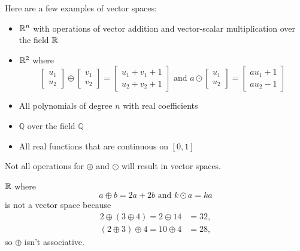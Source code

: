\vspace{1pt}

\begin{example}
	Here are a few examples of vector spaces:
	\begin{itemize}
		\item
		$\mathbb{R}^n$ with operations of vector addition and vector-scalar multiplication over the field $\mathbb{R}$
		\item
		$\mathbb{R}^2$ where
		\begin{equation*}
			\begin{bmatrix}
				u_1 \\ u_2
			\end{bmatrix} \oplus \begin{bmatrix}
				v_1 \\ v_2
			\end{bmatrix} = \begin{bmatrix}
				u_1 + v_1 + 1 \\
				u_2 + v_2 + 1
			\end{bmatrix} \text{ and } a\odot\begin{bmatrix}
				u_1 \\ u_2
			\end{bmatrix} = \begin{bmatrix}
				au_1 + 1 \\ au_2 - 1
			\end{bmatrix}
		\end{equation*}
		\item
		All polynomials of degree $n$ with real coefficients
		\item
		$\mathbb{Q}$ over the field $\mathbb{Q}$
		\item
		All real functions that are continuous on $[0,1]$
	\end{itemize}
\end{example}

Not all operations for $\oplus$ and $\odot$ will result in vector spaces.
\begin{example}
	$\mathbb{R}$ where
	\begin{equation*}
		a \oplus b = 2a + 2b \text { and } k\odot a = ka
	\end{equation*}
	is not a vector space because
	\begin{align*}
		2 \oplus (3 \oplus 4) = 2 \oplus 14 &= 32, \\
		(2 \oplus 3) \oplus 4 = 10 \oplus 4 &= 28,
	\end{align*}
	so $\oplus$ isn't associative.
\end{example}